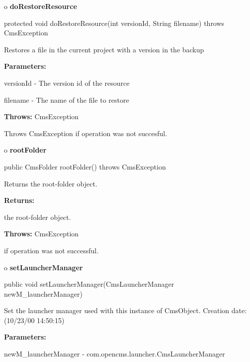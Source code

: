 o {\bf doRestoreResource}

\begin{PRE}
 protected void doRestoreResource(int versionId,
                                  String filename) throws CmsException
\end{PRE}

\begin{description}
\htmlDD Restores a file in the current project with a version in the backup

\begin{description}
\item {\bf Parameters:}

versionId - The version id of the resource

filename - The name of the file to restore
\item {\bf Throws:} CmsException

Throws CmsException if operation was not succesful.
\end{description}

\end{description}

o {\bf rootFolder}

\begin{PRE}
 public CmsFolder rootFolder() throws CmsException
\end{PRE}

\begin{description}
\htmlDD Returns the root-folder object.

\begin{description}
\item {\bf Returns:}

the root-folder object.
\item {\bf Throws:} CmsException

if operation was not successful.
\end{description}

\end{description}

o {\bf setLauncherManager}

\begin{PRE}
 public void setLauncherManager(CmsLauncherManager newM\_launcherManager)
\end{PRE}

\begin{description}
\htmlDD Set the launcher manager used with this instance of CmsObject.
Creation date: (10/23/00 14:50:15)

\begin{description}
\item {\bf Parameters:}

newM\_launcherManager - com.opencms.launcher.CmsLauncherManager
\end{description}

\end{description}

